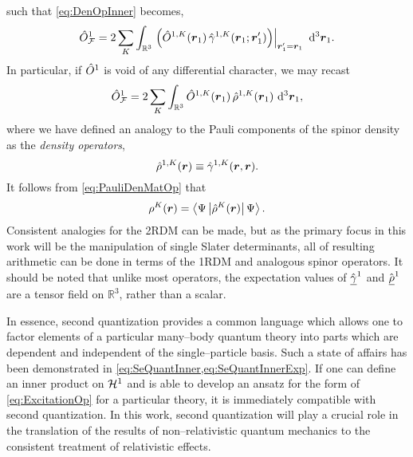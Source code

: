 such that \cref{eq:DenOpInner} becomes,
\begin{equation}
  \hat{O}_{\mathcal{F}}^1 = 2\sum_K \int_{\mathbb R^3} 
    \left.\left(\hat{O}^{1,K} (\boldsymbol{r}_1) \, \hat{\gamma}^{1,K}(\boldsymbol{r}_1; \boldsymbol{r}'_1) \right) \right\vert_{\boldsymbol{r}'_1 = \boldsymbol{r}_1 } 
    \,\,\mathrm{d}^3 \boldsymbol{r}_1.
\end{equation}
In particular, if $\hat{O}^1$ is void of any differential character, we may recast
\begin{equation}
  \hat{O}_{\mathcal{F}}^1 = 2\sum_K \int_{\mathbb R^3} 
    \hat{O}^{1,K} (\boldsymbol{r}_1) \, \hat{\rho}^{1,K}(\boldsymbol{r}_1)  
    \,\,\mathrm{d}^3 \boldsymbol{r}_1,
\end{equation}
where we have defined an analogy to the Pauli components of the spinor density as
the \emph{density operators},
\begin{equation}
\hat{\rho}^{1,K}(\boldsymbol{r}) \equiv \hat{\gamma}^{1,K}(\boldsymbol{r},\boldsymbol{r}).
\end{equation}
It follows from \cref{eq:PauliDenMatOp} that
\begin{equation}
\rho^K(\boldsymbol{r}) = \left\langle \Psi \left\vert \hat{\rho}^K(\boldsymbol{r}) \right\vert \Psi \right\rangle.
\end{equation}
Consistent analogies for the 2RDM can be made, but as the primary focus in this work will be the manipulation
of single Slater determinants, all of resulting arithmetic can be done in terms of the 1RDM and analogous
spinor operators. It should be noted that unlike most operators, the expectation values of 
$\hat{\underline{\gamma}}^1$ and $\hat{\underline{\rho}}^1$ are a tensor field on $\mathbb R^3$, rather than a scalar.


In essence, second quantization provides a common language which allows one to factor elements of a particular many--body
quantum theory into parts which are dependent and independent of the single--particle basis. Such a state of affairs has
been demonstrated in \cref{eq:SeQuantInner,eq:SeQuantInnerExp}. If one can define an inner product on $\mathcal{H}^1$ and
is able to develop an ansatz for the form of \cref{eq:ExcitationOp} for a particular theory, it is immediately compatible
with second quantization. In this work, second quantization will play a crucial role in the translation of the
results of non--relativistic quantum mechanics to the consistent treatment of relativistic effects.



